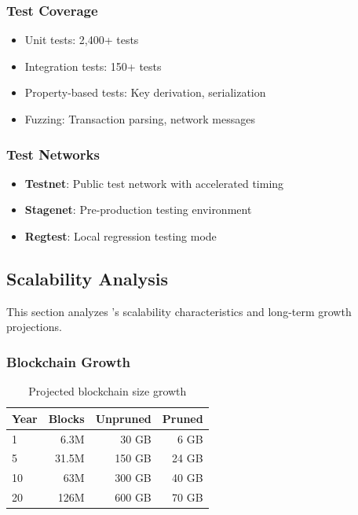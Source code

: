 \subsubsection{Test Coverage}

\begin{itemize}
  \item Unit tests: 2,400+ tests
  \item Integration tests: 150+ tests
  \item Property-based tests: Key derivation, serialization
  \item Fuzzing: Transaction parsing, network messages
\end{itemize}

\subsubsection{Test Networks}

\begin{itemize}
  \item \textbf{Testnet}: Public test network with accelerated timing
  \item \textbf{Stagenet}: Pre-production testing environment
  \item \textbf{Regtest}: Local regression testing mode
\end{itemize}

\subsection{Scalability Analysis}
\label{sec:scalability}

This section analyzes \Botho's scalability characteristics and long-term
growth projections.

\subsubsection{Blockchain Growth}

\begin{table}[h]
\centering
\caption{Projected blockchain size growth}
\label{tab:chain-growth}
\begin{tabular}{@{}lrrr@{}}
\toprule
\textbf{Year} & \textbf{Blocks} & \textbf{Unpruned} & \textbf{Pruned} \\
\midrule
1 & 6.3M & 30 GB & 6 GB \\
5 & 31.5M & 150 GB & 24 GB \\
10 & 63M & 300 GB & 40 GB \\
20 & 126M & 600 GB & 70 GB \\
\bottomrule
\end{tabular}
\end{table}

